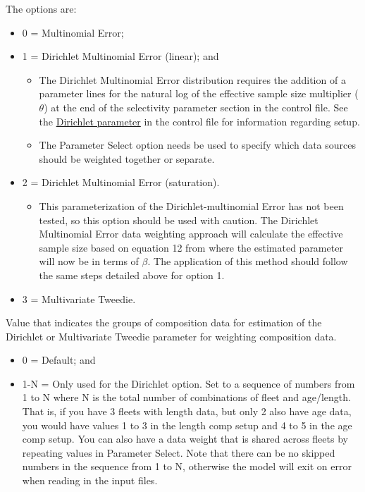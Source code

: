 The options are:
\begin{itemize}
	\item 0 = Multinomial Error;
	\item 1 = Dirichlet Multinomial Error (linear); and
	\begin{itemize}
		\item The Dirichlet Multinomial Error distribution requires the addition of a parameter lines for the natural log of the effective sample size multiplier ($\theta$) at the end of the selectivity parameter section in the control file. See the \hyperlink{Dirichletparameter}{Dirichlet parameter} in the control file for information regarding setup.
		\item The Parameter Select option needs be used to specify which data sources should be weighted together or separate. 
	\end{itemize}
	\item 2 = Dirichlet Multinomial Error (saturation).
	\begin{itemize}
		\item This parameterization of the Dirichlet-multinomial Error has not been tested, so this option should be used with caution. The Dirichlet Multinomial Error data weighting approach will calculate the effective sample size based on equation 12 from \citet{thorson-model-based-2017} where the estimated parameter will now be in terms of $\beta$. The application of this method should follow the same steps detailed above for option 1. 
	\end{itemize}
	\item 3 = Multivariate Tweedie.
\end{itemize}


Value that indicates the groups of composition data for estimation of the Dirichlet or Multivariate Tweedie parameter for weighting composition data.

\begin{itemize}
	\item 0 = Default; and
	\item 1-N = Only used for the Dirichlet option. Set to a sequence of numbers from 1 to N where N is the total number of combinations of fleet and age/length. That is, if you have 3 fleets with length data, but only 2 also have age data, you would have values 1 to 3 in the length comp setup and 4 to 5 in the age comp setup. You can also have a data weight that is shared across fleets by repeating values in Parameter Select. Note that there can be no skipped numbers in the sequence from 1 to N, otherwise the model will exit on error when reading in the input files.
\end{itemize}	

